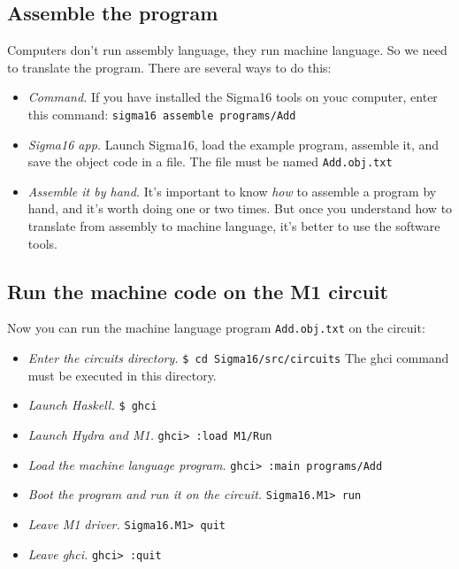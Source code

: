 \documentclass[11pt]{article}
\begin{document}
\subsection{Assemble the program}
\label{sec:org94a495b}

Computers don't run assembly language, they run machine language.  So
we need to translate the program.  There are several ways to do this:

\begin{itemize}
\item \emph{Command.} If you have installed the Sigma16 tools on youc computer,
enter this command: \texttt{sigma16 assemble programs/Add}
\item \emph{Sigma16 app.} Launch Sigma16, load the example program, assemble
it, and save the object code in a file.  The file must be named
\texttt{Add.obj.txt}
\item \emph{Assemble it by hand.}  It's important to know \emph{how} to assemble a
program by hand, and it's worth doing one or two times.  But
once you understand how to translate from assembly to machine
language, it's better to use the software tools.
\end{itemize}

\subsection{Run the machine code on the M1 circuit}
\label{sec:orga8861eb}

Now you can run the machine language program \texttt{Add.obj.txt} on the
circuit:

\begin{itemize}
\item \emph{Enter the circuits directory.} \texttt{\$ cd Sigma16/src/circuits} The ghci
command must be executed in this directory.
\item \emph{Launch Haskell.}  \texttt{\$ ghci}
\item \emph{Launch Hydra and M1.} \texttt{ghci> :load M1/Run}
\item \emph{Load the machine language program.} \texttt{ghci> :main programs/Add}
\item \emph{Boot the program and run it on the circuit.} \texttt{Sigma16.M1> run}
\item \emph{Leave M1 driver.}  \texttt{Sigma16.M1> quit}
\item \emph{Leave ghci.} \texttt{ghci> :quit}
\end{itemize}
\end{document}
